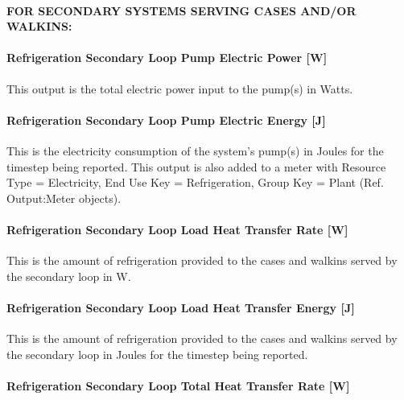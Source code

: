 \paragraph{FOR SECONDARY SYSTEMS SERVING CASES AND/OR WALKINS:}\label{for-secondary-systems-serving-cases-andor-walkins}

\paragraph{Refrigeration Secondary Loop Pump Electric Power {[}W{]}}\label{refrigeration-secondary-loop-pump-electric-power-w}

This output is the total electric power input to the pump(s) in Watts.

\paragraph{Refrigeration Secondary Loop Pump Electric Energy {[}J{]}}\label{refrigeration-secondary-loop-pump-electric-energy-j}

This is the electricity consumption of the system's pump(s) in Joules for the timestep being reported. This output is also added to a meter with Resource Type = Electricity, End Use Key = Refrigeration, Group Key = Plant (Ref. Output:Meter objects).

\paragraph{Refrigeration Secondary Loop Load Heat Transfer Rate {[}W{]}}\label{refrigeration-secondary-loop-load-heat-transfer-rate-w}

This is the amount of refrigeration provided to the cases and walkins served by the secondary loop in W.

\paragraph{Refrigeration Secondary Loop Load Heat Transfer Energy {[}J{]}}\label{refrigeration-secondary-loop-load-heat-transfer-energy-j}

This is the amount of refrigeration provided to the cases and walkins served by the secondary loop in Joules for the timestep being reported.

\paragraph{Refrigeration Secondary Loop Total Heat Transfer Rate {[}W{]}}\label{refrigeration-secondary-loop-total-heat-transfer-rate-w}

